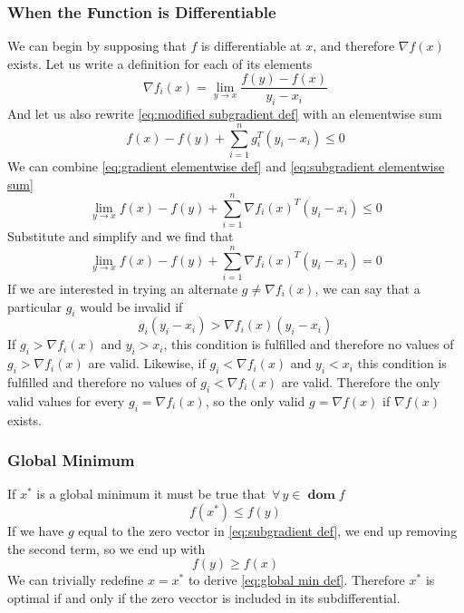 \documentclass[journal,onecolumn]{IEEEtran}
\DeclareMathOperator{\dom}{\mathbf{dom}}
\let\oldforall\forall
\renewcommand{\forall}{ \, \oldforall \, }
\begin{document}
\subsubsection{When the Function is Differentiable}
We can begin by supposing that \(f\) is differentiable at \(x\), and therefore \(\nabla f(x)\) exists. Let us write a definition for each of its elements
\begin{equation}\label{eq:gradient elementwise def}
    \nabla f_i(x) = \lim_{y \rightarrow x} \frac{f(y)-f(x)}{y_i-x_i}
\end{equation}
And let us also rewrite \eqref{eq:modified subgradient def} with an elementwise sum
\begin{equation}\label{eq:subgradient elementwise sum}
f(x) - f(y)+ \sum^{n}_{i=1} g^T_i(y_i-x_i) \leq 0
\end{equation}
We can combine \eqref{eq:gradient elementwise def} and \eqref{eq:subgradient elementwise sum}
\begin{equation}
\lim_{y \rightarrow x} f(x) - f(y)+ \sum^{n}_{i=1} \nabla f_i(x)^T(y_i-x_i) \leq 0
\end{equation}
Substitute and simplify and we find that
\begin{equation}
\lim_{y \rightarrow x} f(x) - f(y)+ \sum^{n}_{i=1} \nabla f_i(x)^T(y_i-x_i) = 0
\end{equation}
If we are interested in trying an alternate \(g \neq \nabla f_i(x)\), we can say that a particular \(g_i\) would be invalid if
\begin{equation}\label{eq:differentiable cookie}
g_i(y_i-x_i) > \nabla f_i(x)(y_i-x_i)
\end{equation}
If \(g_i > \nabla f_i(x)\) and \(y_i > x_i\), this condition is fulfilled and therefore no values of \(g_i > \nabla f_i(x)\) are valid. Likewise, if \(g_i < \nabla f_i(x)\) and \(y_i < x_i\) this condition is fulfilled and therefore no values of \(g_i < \nabla f_i(x)\) are valid. Therefore the only valid values for every \(g_i = \nabla f_i(x)\), so the only valid \(g = \nabla f(x)\) if \(\nabla f(x)\) exists.

\subsubsection{Global Minimum}
If \(x^*\) is a global minimum it must be true that \(\forall y \in \dom f\)
\begin{equation}\label{eq:global min def}
f(x^*) \leq f(y)
\end{equation}
If we have \(g\) equal to the zero vector in \eqref{eq:subgradient def}, we end up removing the second term, so we end up with
\begin{equation}\label{eq:zero vector subgradient}
f(y) \geq f(x)
\end{equation}
We can trivially redefine \(x = x^*\) to derive \eqref{eq:global min def}. Therefore \(x^*\) is optimal if and only if the zero vecctor is included in its subdifferential.
\end{document}
